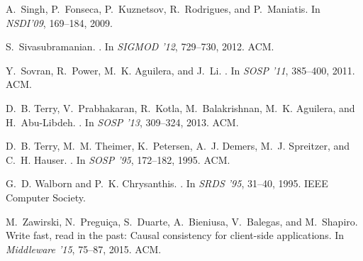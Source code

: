 \documentclass[11pt]{article}
\begin{document}
\begin{thebibliography}{10}
\begin{small}
A.~Singh, P.~Fonseca, P.~Kuznetsov, R.~Rodrigues, and P.~Maniatis.
\newblock In {\em NSDI'09}, 169--184, 2009.

S.~Sivasubramanian.
.
\newblock In {\em SIGMOD '12}, 729--730, 2012. ACM.

Y.~Sovran, R.~Power, M.~K. Aguilera, and J.~Li.
.
\newblock In {\em SOSP  '11}, 385--400, 2011. ACM.
  

D.~B. Terry, V.~Prabhakaran, R.~Kotla, M.~Balakrishnan, M.~K. Aguilera, and
  H.~Abu-Libdeh.
.
\newblock In {\em SOSP '13}, 309--324, 2013. ACM.

D.~B. Terry, M.~M. Theimer, K.~Petersen, A.~J. Demers, M.~J. Spreitzer, and
  C.~H. Hauser.
.
\newblock In {\em SOSP  '95}, 172--182, 1995. ACM.

G.~D. Walborn and P.~K. Chrysanthis.
.
\newblock In {\em SRDS '95}, 31--40, 1995. IEEE Computer Society.
  

M.~Zawirski, N.~Pregui\c{c}a, S.~Duarte, A.~Bieniusa, V.~Balegas, and
  M.~Shapiro.
\newblock Write fast, read in the past: Causal consistency for client-side
  applications.
\newblock In {\em Middleware '15}, 75--87, 2015. ACM.
  


\end{small}
\end{thebibliography}
\end{document}
